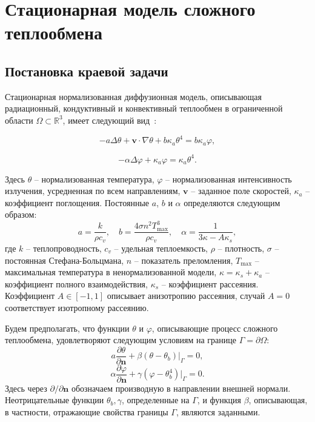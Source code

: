 \section{Стационарная модель сложного теплообмена}\label{sec:ch1/sec3}

\subsection{Постановка краевой задачи}
\label{subsec:ch1/sec3/state}

Стационарная нормализованная диффузионная модель, описывающая
радиационный, кондуктивный и конвективный теплообмен в
ограниченной области $\Omega \subset \mathbb{R}^3$,
имеет следующий вид~\cite{modest2013radiative}:

\begin{equation}
    \label{eq:1_4:4-1}
    -a \Delta \theta + \textbf{v} \cdot \nabla \theta
    + b \kappa_a \theta^4 =  b \kappa_a \varphi,
\end{equation}

\begin{equation}
    \label{eq:1_4:4-2}
    - \alpha \Delta \varphi + \kappa_a \varphi = \kappa_a \theta^4.
\end{equation}

Здесь $\theta$ -- нормализованная температура, $\varphi$ --
нормализованная интенсивность излучения, усредненная по всем
направлениям, $\textbf{v}$ -- заданное поле скоростей, $\kappa_a$ --
коэффициент поглощения.
Постоянные $a$, $b$ и $\alpha$
определяются следующим образом:
\[
    a=\frac{k}{\rho c_v},\quad b = \frac{4\sigma n^2 T_{\max}^3}{\rho c_v},
    \quad \alpha=\frac{1}{3\kappa - A \kappa_s},
\]
где $k$ -- теплопроводность, $c_v$ -- удельная теплоемкость, $\rho$ --
плотность, $\sigma$ -- постоянная Стефана-Больцмана, $n$ --
показатель преломления, $T_{\max}$ -- максимальная температура в
ненормализованной модели, $\kappa = \kappa_s + \kappa_a$ -- коэффициент
полного взаимодействия, $\kappa_s$ -- коэффициент рассеяния.
Коэффициент $A \in [-1, 1]$ описывает анизотропию рассеяния, случай
$A=0$ соответствует изотропному рассеянию.

Будем предполагать, что функции $\theta$ и $\varphi$, описывающие
процесс сложного теплообмена, удовлетворяют следующим условиям на
границе $\Gamma = \partial \Omega$:
\begin{equation}
    \label{eq:1_4:4-3}
    a \frac{\partial \theta}{\partial \mathbf{n}}
    +\left.\beta\left(\theta-\theta_{b}\right)\right|_{\Gamma}=0,
\end{equation}
\begin{equation}
    \label{eq:1_4:4-4}
    \alpha \frac{\partial \varphi}{\partial \mathbf{n}} + \gamma
    (\varphi-\theta_b^4)|_{\Gamma} = 0.
\end{equation}
Здесь через $\partial/\partial \mathbf{n}$ обозначаем производную
в направлении внешней нормали.
Неотрицательные функции $\theta_{b}, \gamma$, определенные на $\Gamma$, и функция $\beta$,
описывающая, в частности, отражающие свойства границы $\Gamma$, являются заданными.

